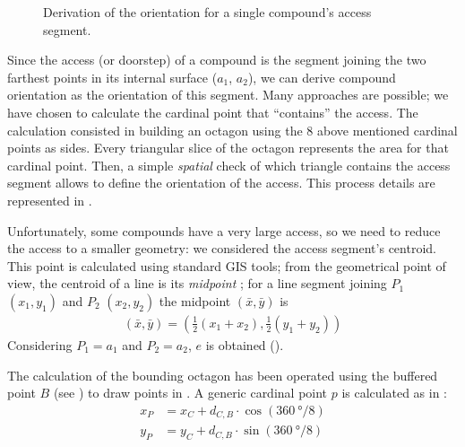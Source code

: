 \begin{wrapfigure}{r}{0.45\textwidth}
                    \caption[Graphical rapresentation of the steps to derive compound's access orientation.]{Derivation of the orientation for a single compound's access segment.%
                    }
                    \label{fig:comp-orient}
                    \vspace{-0.1\textheight}
                \end{wrapfigure}
                Since the access (or doorstep) of a compound is the segment joining the two farthest points in its internal surface ($a_1$, $a_2$), we can derive compound orientation as the orientation of this segment. Many approaches are possible; we have chosen to calculate the cardinal point that ``contains'' the access. The calculation consisted in building an octagon using the 8 above mentioned cardinal points as sides. Every triangular slice of the octagon represents the area for that cardinal point. Then, a simple \emph{spatial} check of which triangle contains the access segment allows to define the orientation of the access. This process details are represented in .
                
                Unfortunately, some compounds have a very large access, so we need to reduce the access to a smaller geometry: we considered the access segment's centroid. This point is calculated using standard GIS tools; from the geometrical point of view, the centroid of a line is its \emph{midpoint} \cite{calculus-geom}; for a line segment joining $P_1$ $(x_1, y_1)$ and $P_2$ $(x_2, y_2)$ the midpoint $(\bar{x}, \bar{y})$ is
                \begin{align}
                    \label{eq:midpoint}
                    \left(\bar{x}, \bar{y}\right) = \left(\frac{1}{2}\left(x_1 + x_2\right),\frac{1}{2}\left(y_1 + y_2\right)\right)
                \end{align}
                Considering $P_1 = a_1$ and $P_2 = a_2$, $e$ is obtained ().
                
                The calculation of the bounding octagon has been operated using the buffered point $B$ (see ) to draw points in . A generic cardinal point $p$ is calculated as in :
                \begin{align}
                    \label{eq:point-cardinal}
                    x_P &= x_C + d_{C,B}\cdot\cos{(\SI{360}{\degree}/8)}\\
                    y_P &= y_C + d_{C,B}\cdot\sin{(\SI{360}{\degree}/8)}
                \end{align}
                
